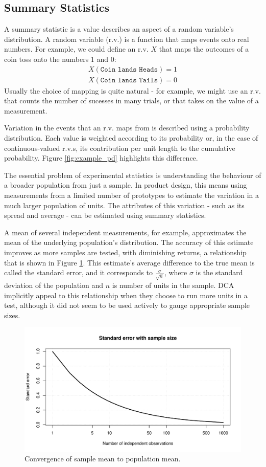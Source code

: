 \documentclass[11pt,a4paper,article]{memoir} %
\begin{document}
\subsection*{Summary Statistics}
 A summary statistic is a value describes an aspect of a random variable's distribution. A random variable (r.v.) is a function that maps events onto real numbers. For example, we could define an r.v. $X$ that maps the outcomes of a coin toss onto the numbers 1 and 0:
 \begin{align}
	X(\texttt{Coin lands Heads}) = 1 \\
	X(\texttt{Coin lands Tails}) =0
 \end{align}
Usually the choice of mapping is quite natural - for example, we might use an r.v. that counts the number of sucesses in many trials, or that takes on the value of a measurement.
\par
Variation in the events that an r.v. maps from is described using a probability distribution. Each value is weighted according to its probability or, in the case of continuous-valued r.v.s, its contribution per unit length to the cumulative probability. Figure \ref{fig:example_pd} highlights this difference.
\par
The essential problem of experimental statistics is understanding the behaviour of a broader population from just a sample. In product design, this means using measurements from a limited number of prototypes to estimate the variation in a much larger population of units. The attributes of this variation - such as its spread and average - can be estimated using summary statistics.
 \par
A mean of several independent measurements, for example, approximates the mean of the underlying population's distribution. The accuracy of this estimate improves as more samples are tested, with diminishing returns, a relationship that is shown in Figure \ref{fig:se_with_sample_size}. This estimate's average difference to the true mean is called the standard error, and it corresponds to $\frac{\sigma}{\sqrt{n}}$, where $\sigma$ is the standard deviation of the population and $n$ is number of units in the sample. DCA implicitly appeal to this relationship when they choose to run more units in a test, although it did not seem to be used actively to gauge appropriate sample sizes.
\begin{figure}[h]
\includegraphics[width=\textwidth]{se_with_sample_size.pdf}
\caption{Convergence of sample mean to population mean.}
\label{fig:se_with_sample_size}
\end{figure}
\end{document}
